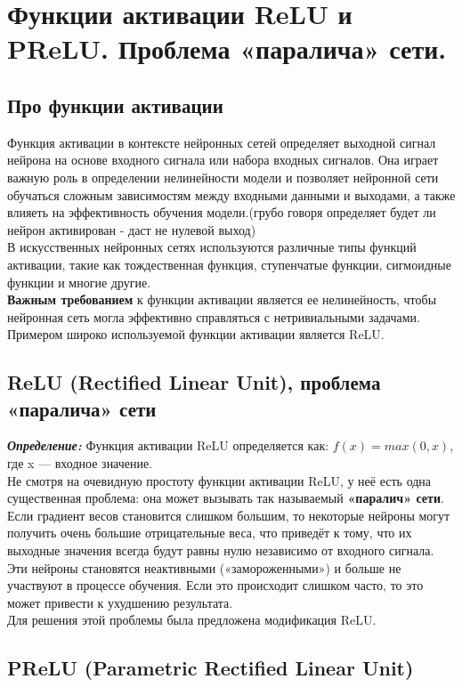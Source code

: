 \section{Функции активации ReLU и PReLU. Проблема «паралича» сети.}
\subsection{Про функции активации}

Функция активации в контексте нейронных сетей определяет выходной сигнал нейрона на основе входного сигнала или набора входных сигналов. Она играет важную роль в определении нелинейности модели и позволяет нейронной сети обучаться сложным зависимостям между входными данными и выходами, а также влияеть на эффективность обучения модели.(грубо говоря определяет будет ли нейрон активирован - даст не нулевой выход) \\
В искусственных нейронных сетях используются различные типы функций активации, такие как тождественная функция, ступенчатые функции, сигмоидные функции и многие другие. \\
\textbf{Важным требованием} к функции активации является ее нелинейность, чтобы нейронная сеть могла эффективно справляться с нетривиальными задачами.\\ Примером широко используемой функции активации является ReLU.

\subsection{ReLU (Rectified Linear Unit), проблема «паралича» сети}

\textbf{\textit{Определение:}} 
Функция активации ReLU определяется как:
$f(x) = max(0, x)$, где x — входное значение.\\
Не смотря на очевидную простоту функции активации ReLU, у неё есть одна существенная проблема: она может вызывать так называемый \textbf{«паралич» сети}.\\
Если градиент весов становится слишком большим, то некоторые нейроны могут получить очень большие отрицательные веса, что приведёт к тому, что их выходные значения всегда будут равны нулю независимо от входного сигнала. Эти нейроны становятся неактивными («замороженными») и больше не участвуют в процессе обучения. Если это происходит слишком часто, то это может привести к ухудшению результата.\\
Для решения этой проблемы была предложена модификация ReLU.
\subsection{PReLU (Parametric Rectified Linear Unit)}

